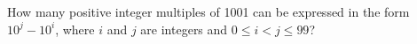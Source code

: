 How many positive integer multiples of 1001 can be expressed in the form $10^{j}-10^{i}$, where $i$ and $j$ are integers and $0\leq i < j \leq 99$?